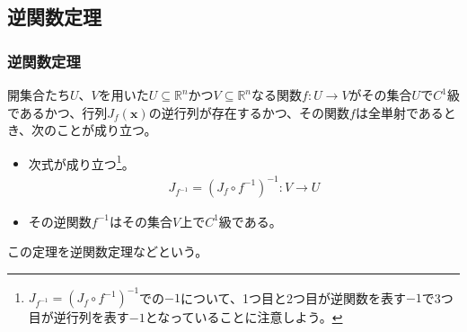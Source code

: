 \documentclass[dvipdfmx]{jsarticle}
\begin{document}
\subsection{逆関数定理}%
\subsubsection{逆関数定理}%
\begin{thm*}
開集合たち$U$、$V$を用いた$U \subseteq \mathbb{R}^{n}$かつ$V \subseteq \mathbb{R}^{n}$なる関数$f:U \rightarrow V$がその集合$UでC^{1}$級であるかつ、行列$J_{f}\left( \mathbf{x} \right)$の逆行列が存在するかつ、その関数$f$は全単射であるとき、次のことが成り立つ。
\begin{itemize}
\item
  次式が成り立つ\footnote{$J_{f^{- 1}} = \left( J_{f} \circ f^{- 1} \right)^{- 1}$での$- 1$について、1つ目と2つ目が逆関数を表す$- 1$で3つ目が逆行列を表す$- 1$となっていることに注意しよう。}。
\begin{align*}
J_{f^{- 1}} = \left( J_{f} \circ f^{- 1} \right)^{- 1}:V \rightarrow U
\end{align*}
\item
  その逆関数$f^{- 1}$はその集合$V$上で$C^{1}$級である。
\end{itemize}
この定理を逆関数定理などという。
\end{thm*}
\end{document}
